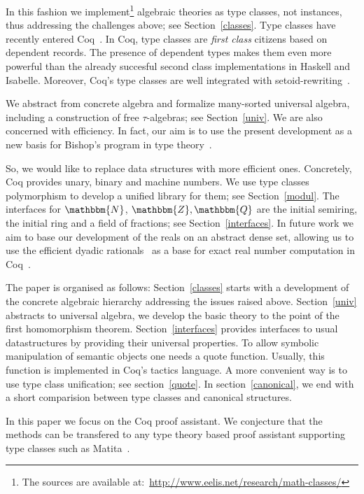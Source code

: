 \documentclass[a4paper,10pt, runningheads]{llncs}
\newcommand{\N}{\ensuremath{\mathbbm{N}}}
\newcommand{\Z}{\ensuremath{\mathbbm{Z}}}
\newcommand{\Q}{\ensuremath{\mathbbm{Q}}}
\begin{document}
In this fashion we implement\footnote{The sources are available
at:~\url{http://www.eelis.net/research/math-classes/}}
 algebraic theories as type classes, not instances, thus addressing the
challenges above; see Section~\ref{classes}. Type classes have recently entered
Coq~\cite{DBLP:conf/tphol/SozeauO08}. In Coq,
type classes are \emph{first class} citizens based on dependent records. The presence of dependent types makes them even more
powerful than the already succesful second class implementations in Haskell and Isabelle. Moreover,
Coq's type classes are well integrated with setoid-rewriting~\cite{Setoid-rewrite}.

We abstract from concrete algebra and formalize many-sorted universal algebra, including a
construction of
free $\tau$-algebras; see Section~\ref{univ}. We are also concerned with efficiency.
In fact, our aim is to use the present development as a new basis for Bishop's program in type
theory~\cite{typesreal-article}.

So, we would like to replace data structures with more efficient ones. Concretely,
Coq provides unary, binary and machine numbers. We use type classes polymorphism to
develop a unified library for them; see Section~\ref{modul}.
The interfaces for $\N$, $\Z,\Q$ are the initial semiring, the initial ring and a field of
fractions; see Section~\ref{interfaces}. In future work we aim to base our development of the reals
on an abstract dense set, allowing us to use the efficient dyadic
rationals~\cite{boldo2009combining} as a base for exact real number computation in
Coq~\cite{Riemann,Oconnor:real}.

The paper is organised as follows: Section~\ref{classes} starts with a development of the concrete
algebraic hierarchy addressing the issues raised above. Section~\ref{univ} abstracts to universal
algebra, we develop the basic theory to the point of the first homomorphism theorem.
Section~\ref{interfaces} provides interfaces to usual datastructures by providing their universal
properties. To allow symbolic manipulation of semantic objects one needs a quote function. Usually,
this function is implemented in Coq's tactics language. A more convenient way is to use type class
unification; see section~\ref{quote}. In section~\ref{canonical}, we end with a short comparision
between type classes and canonical structures.

In this paper we focus on the Coq proof assistant. We conjecture that the methods can be transfered
to any type theory based proof assistant supporting type classes such as
Matita~\cite{asperti2007user}.
\end{document}
